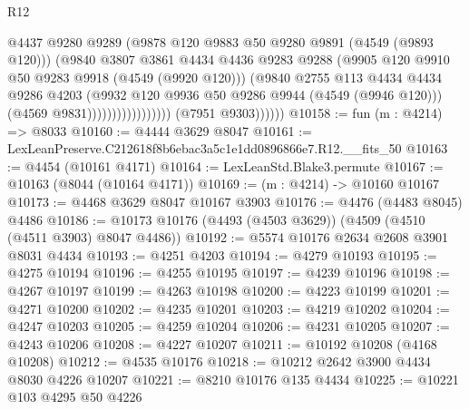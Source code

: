 \begin{lexlean}{R12}
\begin{coremodule}
                                          @4437
                                          @9280
                                          @9289
                                          (@9878 @120 @9883 @50 @9280 @9891 (@4549 (@9893 @120)))
                                          (@9840
                                            @3807
                                            @3861
                                            @4434
                                            @4436
                                            @9283
                                            @9288
                                            (@9905 @120 @9910 @50 @9283 @9918 (@4549 (@9920 @120)))
                                            (@9840
                                              @2755
                                              @113
                                              @4434
                                              @4434
                                              @9286
                                              @4203
                                              (@9932
                                                @120
                                                @9936
                                                @50
                                                @9286
                                                @9944
                                                (@4549 (@9946 @120)))
                                              (@4569 @9831)))))))))))))))))
              (@7951 @9303))))))
@10158 := fun (m : @4214) => @8033
@10160 := @4444 @3629 @8047
@10161 := LexLeanPreserve.C212618f8b6ebac3a5c1e1dd0896866e7.R12.__fits_50
@10163 := @4454 (@10161 @4171)
@10164 := LexLeanStd.Blake3.permute
@10167 := @10163 (@8044 (@10164 @4171))
@10169 := (m : @4214) -> @10160 @10167
@10173 := @4468 @3629 @8047 @10167 @3903
@10176 := @4476 (@4483 @8045) @4486
@10186 := @10173 @10176 (@4493 (@4503 @3629)) (@4509 (@4510 (@4511 @3903) @8047 @4486))
@10192 := @5574 @10176 @2634 @2608 @3901 @8031 @4434
@10193 := @4251 @4203
@10194 := @4279 @10193
@10195 := @4275 @10194
@10196 := @4255 @10195
@10197 := @4239 @10196
@10198 := @4267 @10197
@10199 := @4263 @10198
@10200 := @4223 @10199
@10201 := @4271 @10200
@10202 := @4235 @10201
@10203 := @4219 @10202
@10204 := @4247 @10203
@10205 := @4259 @10204
@10206 := @4231 @10205
@10207 := @4243 @10206
@10208 := @4227 @10207
@10211 := @10192 @10208 (@4168 @10208)
@10212 := @4535 @10176
@10218 := @10212 @2642 @3900 @4434 @8030 @4226 @10207
@10221 := @8210 @10176 @135 @4434
@10225 := @10221 @103 @4295 @50 @4226

\end{coremodule}
\end{lexlean}
